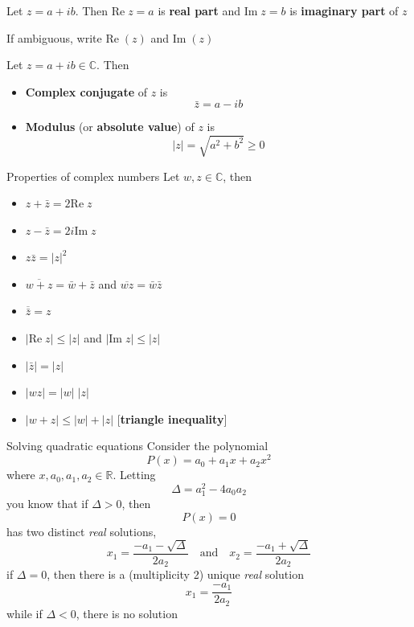 \documentclass{beamer}
\def\IC{\mathbb{C}}
\def\IR{\mathbb{R}}
\def\Im{\textrm{Im}\;}
\def\Re{\textrm{Re}\;}
\begin{document}
\begin{frame}
	\begin{definition}
		Let $z=a+ib$. Then $\Re z=a$ is \textbf{real part} and $\Im z=b$ is \textbf{imaginary part} of $z$
	\end{definition}
	\vfill
	If ambiguous, write $\Re(z)$ and $\Im(z)$
	\vfill
	\begin{definition}
		Let $z=a+ib\in\IC$. Then
		\begin{itemize}
			\item \textbf{Complex conjugate} of $z$ is
			\[
			\bar z = a-ib
			\]
			\item \textbf{Modulus} (or \textbf{absolute value}) of $z$ is
			\[
			|z|=\sqrt{a^2+b^2} \geq 0
			\]
		\end{itemize}
	\end{definition}
\end{frame}

\begin{frame}{Properties of complex numbers}
	Let $w,z\in\IC$, then
	\begin{itemize}
		\item $z+\bar z=2\Re z$
		\item $z-\bar z=2i\Im z$
		\item $z\bar z=|z|^2$
		\item $\overline{w+z}=\bar w+\bar z$ and $\overline{wz}=\bar w\bar z$
		\item $\overline{\bar z}=z$
		\item $|\Re z|\leq |z|$ and $|\Im z|\leq |z|$
		\item $|\bar z|=|z|$
		\item $|wz|=|w|\;|z|$
		\item $|w+z|\leq |w|+|z|$ \hfill[\textbf{triangle inequality}]
	\end{itemize}
\end{frame}


\begin{frame}{Solving quadratic equations}
Consider the polynomial
\[
P(x)=a_0+a_1x+a_2x^2
\]
where $x,a_0,a_1,a_2\in\IR$. Letting
\[
\Delta = a_1^2-4a_0a_2
\]
you know that if $\Delta>0$, then 
\[
P(x)=0
\]
has two distinct \emph{real} solutions, 
\[
x_1=\frac{-a_1-\sqrt{\Delta}}{2a_2}
\quad\textrm{and}\quad
x_2=\frac{-a_1+\sqrt{\Delta}}{2a_2}
\]
if $\Delta=0$, then there is a (multiplicity 2) unique \emph{real} solution
\[
x_{1}=\frac{-a_1}{2a_2}
\]
while if $\Delta<0$, there is no solution
\end{frame}
\end{document}
